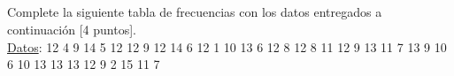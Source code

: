 \documentclass{cdplf-prueba}
\begin{document}
\subsection{} Complete la siguiente tabla de frecuencias con los datos entregados a continuación [4 puntos].
\\[3pt]
\underline{Datos}: 12 {\textbullet} 4 {\textbullet} 9 {\textbullet} 14 {\textbullet} 5 {\textbullet} 12 {\textbullet} 12 {\textbullet} 9 {\textbullet} 12 {\textbullet} 14 {\textbullet} 6 {\textbullet} 12 {\textbullet} 1 {\textbullet} 10 {\textbullet} 13 {\textbullet} 6 {\textbullet} 12 {\textbullet} 8 {\textbullet} 12 {\textbullet} 8 {\textbullet} 11 {\textbullet} 12 {\textbullet} 9 {\textbullet} 13 {\textbullet} 11 {\textbullet} 7 {\textbullet} 13 {\textbullet} 9 {\textbullet} 10 {\textbullet} 6 {\textbullet} 10 {\textbullet} 13 {\textbullet} 13 {\textbullet} 13 {\textbullet} 12 {\textbullet} 9 {\textbullet} 2 {\textbullet} 15 {\textbullet} 11 {\textbullet} 7
\vspace{3pt}
\end{document}
